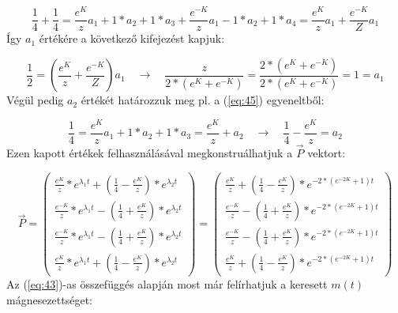 \begin{equation}  \label{eq:51}
    \frac{1}{4} + \frac{1}{4}
    =
    \frac{e^{K}}{z} a_{1} + 1 * a_{2} + 1 * a_{3} + \frac{e^{-K}}{z} a_{1} - 1 * a_{2} + 1 * a_{4}
    =
    \frac{e^{K}}{z} a_{1} + \frac{e^{-K}}{Z} a_{1}
\end{equation}
Így $a_{1}$ értékére a következő kifejezést kapjuk:

\begin{equation} \label{eq:52}
    \frac{1}{2}
    =
    \left( \frac{e^{K}}{z} + \frac{e^{-K}}{Z} \right) a_{1}
    \quad \to \quad
    \frac{z}{2 * \left( e^{K} + e^{-K} \right)}
    =
    \frac{2 * \left( e^{K} + e^{-K} \right)}{2 * \left( e^{K} + e^{-K} \right)}
    =
    \boxed{
    1
    =
    a_{1}}
\end{equation}
Végül pedig $a_{2}$ értékét határozzuk meg pl. a (\ref{eq:45}) egyeneltből:

\begin{equation} \label{eq:53}
    \frac{1}{4}
    =
    \frac{e^{K}}{z} a_{1} + 1 * a_{2} + 1 * a_{3}
    =
    \frac{e^{K}}{z} + a_{2}
    \quad \to \quad
    \boxed{
    \frac{1}{4} - \frac{e^{K}}{z}
    =
    a_{2}}
\end{equation}
Ezen kapott értékek felhasználásával megkonstruálhatjuk a $\vec{P}$ vektort:

\begin{equation} \label{eq:54}
    \vec{P}
    =
    \begin{pmatrix}
        \frac{e^{K}}{z}  * e^{\lambda_{1} t} +  \left( \frac{1}{4} - \frac{e^{K}}{z} \right) * e^{\lambda_2 t} \\
        \frac{e^{-K}}{z} * e^{\lambda_{1} t} -  \left( \frac{1}{4} + \frac{e^{K}}{z} \right) * e^{\lambda_2 t} \\
        \frac{e^{-K}}{z} * e^{\lambda_{1} t} -  \left( \frac{1}{4} + \frac{e^{K}}{z} \right) * e^{\lambda_2 t} \\
        \frac{e^{K}}{z}  * e^{\lambda_{1} t} +  \left( \frac{1}{4} - \frac{e^{K}}{z} \right) * e^{\lambda_2 t}
    \end{pmatrix}
    =
    \begin{pmatrix}
        \frac{e^{K}}{z}   +  \left( \frac{1}{4} - \frac{e^{K}}{z} \right) * e^{-2 * \left(e^{-2K} + 1 \right) t} \\
        \frac{e^{-K}}{z}  -  \left( \frac{1}{4} + \frac{e^{K}}{z} \right) * e^{-2 * \left(e^{-2K} + 1 \right) t} \\
        \frac{e^{-K}}{z}  -  \left( \frac{1}{4} + \frac{e^{K}}{z} \right) * e^{-2 * \left(e^{-2K} + 1 \right) t} \\
        \frac{e^{K}}{z}   +  \left( \frac{1}{4} - \frac{e^{K}}{z} \right) * e^{-2 * \left(e^{-2K} + 1 \right) t}
    \end{pmatrix}
\end{equation}
Az (\ref{eq:43})-as összefüggés alapján most már felírhatjuk a keresett $m \left( t \right)$ mágnesezettséget:

